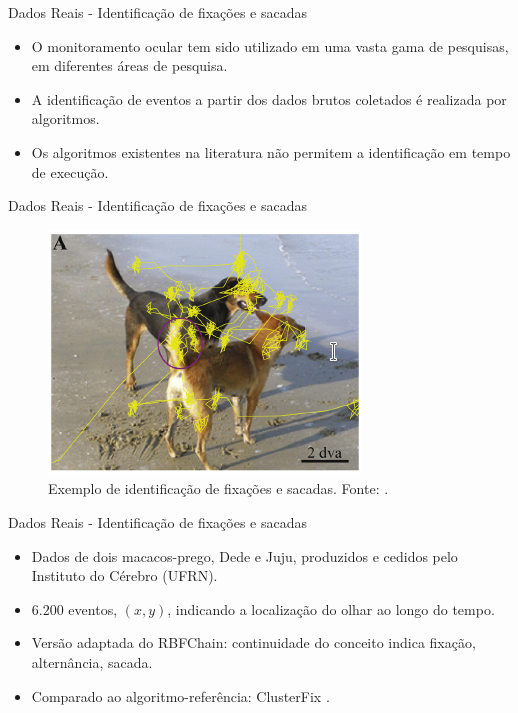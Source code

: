 \documentclass[10pt]{beamer}
\begin{document}
\begin{frame}{Dados Reais - Identificação de fixações e sacadas}
    \begin{itemize}
        \item O monitoramento ocular tem sido utilizado em uma vasta gama de pesquisas, em diferentes áreas de pesquisa.
        \item A identificação de eventos a partir dos dados brutos coletados é realizada por algoritmos.
        \item Os algoritmos existentes na literatura não permitem a identificação em tempo de execução.
    \end{itemize}
\end{frame}

\begin{frame}{Dados Reais - Identificação de fixações e sacadas}
    \begin{figure}[H]
        \begin{center}
            \includegraphics[scale=1]{imagens/exemplo_fixacao_e_sacadas.png}
            \caption{Exemplo de identificação de fixações e sacadas. Fonte: \cite{KONIG2014121}.}
            \label{fig:exemplo_fixacoes_e_sacadas}
        \end{center}
    \end{figure}
\end{frame}

\begin{frame}{Dados Reais - Identificação de fixações e sacadas}
    \begin{itemize}
        \item Dados de dois macacos-prego, Dede e Juju, produzidos e cedidos pelo Instituto do Cérebro (UFRN).
        \item $6.200$ eventos, $(x, y)$, indicando a localização do olhar ao longo do tempo.
        \item Versão adaptada do RBFChain: continuidade do conceito indica fixação, alternância, sacada.
        \item Comparado ao algoritmo-referência: ClusterFix \cite{KONIG2014121}.
    \end{itemize}
\end{frame}
\end{document}
